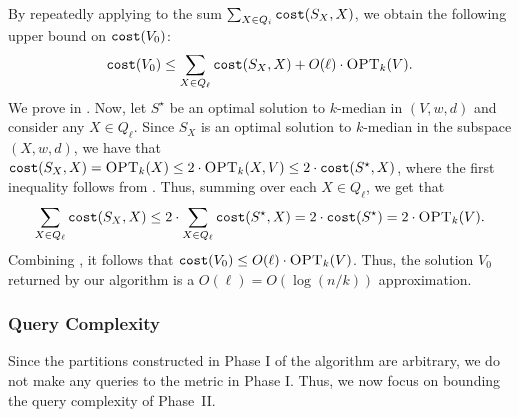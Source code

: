 \documentclass[11pt]{article}
\newcommand{\1}{\mathmybb{1}}
\newcommand{\OPT}{\textsc{OPT}}
\newcommand{\cost}{\textnormal{\texttt{cost}}}
\begin{document}
By repeatedly applying  to the sum $\sum_{X\in Q_i}\cost(S_X, X)$, we obtain the following upper bound on $\cost(V_0)$:
\begin{equation}\label{eq:myeqq}
    \cost(V_0) \leq \sum_{X \in Q_\ell} \cost(S_{X}, X) +  O(\ell) \cdot \OPT_k(V).
\end{equation}
We prove  in .
Now, let $S^\star$ be an optimal solution to $k$-median in $(V,w,d)$ and consider any $X \in Q_\ell$. Since $S_X$ is an optimal solution to $k$-median in the subspace $(X, w, d)$, we have that $\cost(S_X, X) = \OPT_k(X) \leq 2 \cdot \OPT_k(X, V) \leq 2 \cdot \cost(S^\star, X)$, where the first inequality follows from . Thus, summing over each $X \in Q_\ell$, we get that
\begin{equation}\label{eq:myeqq2}
    \sum_{X \in Q_\ell} \cost(S_X, X) \leq 2 \cdot \sum_{X \in Q_\ell} \cost(S^\star, X) = 2 \cdot \cost(S^\star) = 2\cdot \OPT_k(V).
\end{equation}
Combining , it follows that $\cost(V_0) \leq O(\ell) \cdot \OPT_k(V)$. Thus, the solution $V_0$ returned by our algorithm is a $O(\ell) = O(\log(n/k))$ approximation.

\subsubsection*{Query Complexity}
Since the partitions constructed in Phase I of the algorithm are arbitrary, we do not make any queries to the metric in Phase I.
Thus, we now focus on bounding the query complexity of Phase~II.
\end{document}
